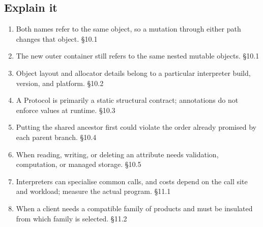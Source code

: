 \documentclass[11pt]{article}
\begin{document}
\begin{keepsection}\subsection{Explain it}

\begin{enumerate}
\item Both names refer to the same object, so a mutation through either path changes that object. \hfill{\small\color{FAUblue}§10.1}
\item The new outer container still refers to the same nested mutable objects. \hfill{\small\color{FAUblue}§10.1}
\item Object layout and allocator details belong to a particular interpreter build, version, and platform. \hfill{\small\color{FAUblue}§10.2}
\item A Protocol is primarily a static structural contract; annotations do not enforce values at runtime. \hfill{\small\color{FAUblue}§10.3}
\item Putting the shared ancestor first could violate the order already promised by each parent branch. \hfill{\small\color{FAUblue}§10.4}
\item When reading, writing, or deleting an attribute needs validation, computation, or managed storage. \hfill{\small\color{FAUblue}§10.5}
\item Interpreters can specialise common calls, and costs depend on the call site and workload; measure the actual program. \hfill{\small\color{FAUblue}§11.1}
\item When a client needs a compatible family of products and must be insulated from which family is selected. \hfill{\small\color{FAUblue}§11.2}
\end{enumerate}

\end{keepsection}
\end{document}
